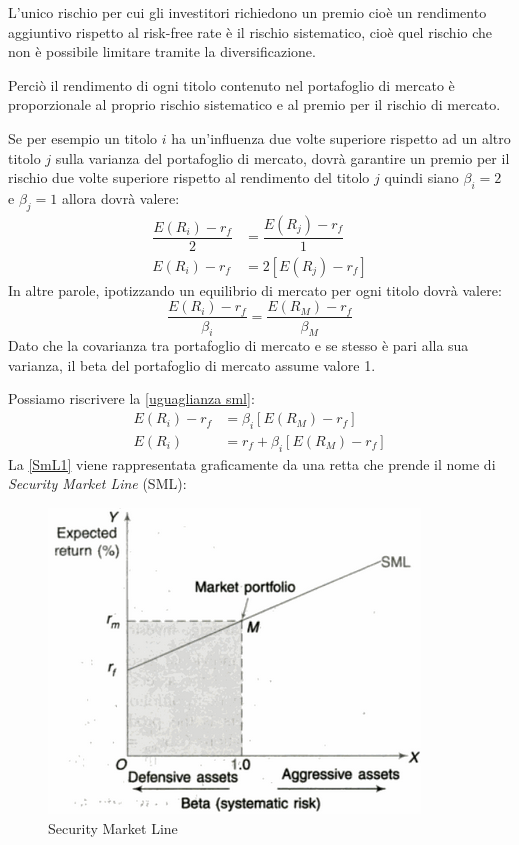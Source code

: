 L'unico rischio per cui gli investitori richiedono un premio cioè un rendimento aggiuntivo rispetto al risk-free rate è il rischio sistematico, cioè quel rischio che non è possibile limitare tramite la diversificazione.

Perciò il rendimento di ogni titolo contenuto nel portafoglio di mercato è proporzionale al proprio rischio sistematico e al premio per il rischio di mercato. 

Se per esempio un titolo $i$ ha un'influenza due volte superiore rispetto ad un altro titolo $j$ sulla varianza del portafoglio di mercato, dovrà garantire un premio per il rischio due volte superiore rispetto al rendimento del titolo $j$ quindi siano  $\beta_{i}=2$ e  $\beta_{j}=1$ allora dovrà valere:
\begin{equation}
\begin{split}
\dfrac{E(R_{i})-r_{f}}{2} & =\dfrac{E(R_{j})-r_{f}}{1} \\
E(R_{i})-r_{f} & = 2[E(R_{j})-r_{f}]
\end{split}
\end{equation}
In altre parole, ipotizzando un equilibrio di mercato per ogni titolo dovrà valere:
\begin{equation}
\label{uguaglianza sml}
\dfrac{E(R_{i})-r_{f}}{\beta_{i}} =\dfrac{E(R_{M})-r_{f}}{\beta_{M}}
\end{equation}
Dato che la covarianza tra portafoglio di mercato e se stesso è pari alla sua varianza, il beta del portafoglio di mercato assume valore 1.

Possiamo riscrivere la  \ref{uguaglianza sml}:
\begin{equation}
\label{SmL1}
\begin{split}
E(R_{i})-r_{f} & =\beta_{i}[E(R_{M})-r_{f}]\\
E(R_{i}) & = r_{f}+\beta_{i}[E(R_{M})-r_{f}]
\end{split}
\end{equation}
La \ref{SmL1} viene rappresentata graficamente da una retta che prende il nome di \textit{Security Market Line} (SML):
\begin{figure} [h!]
	\centering
	\includegraphics[width=0.5\linewidth]{"imgs/sml"}
	\caption{Security Market Line \cite{jain_financial_2007}}
	\label{fig:sml}
\end{figure}


